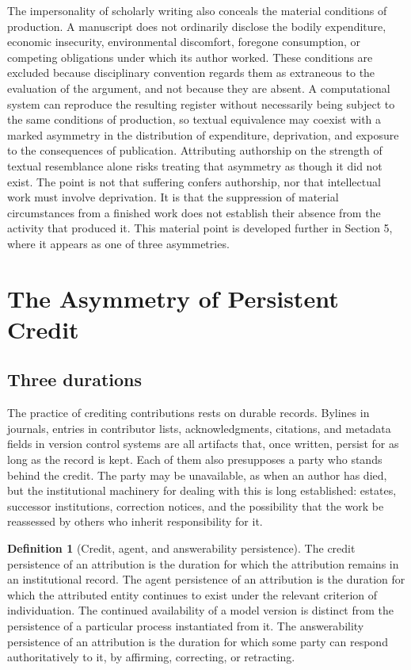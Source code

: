 \documentclass[12pt]{article}
\theoremstyle{definition}
\newtheorem{definition}{Definition}
\theoremstyle{plain}
\begin{document}
The impersonality of scholarly writing also conceals the material conditions of production. A manuscript does not ordinarily disclose the bodily expenditure, economic insecurity, environmental discomfort, foregone consumption, or competing obligations under which its author worked. These conditions are excluded because disciplinary convention regards them as extraneous to the evaluation of the argument, and not because they are absent. A computational system can reproduce the resulting register without necessarily being subject to the same conditions of production, so textual equivalence may coexist with a marked asymmetry in the distribution of expenditure, deprivation, and exposure to the consequences of publication. Attributing authorship on the strength of textual resemblance alone risks treating that asymmetry as though it did not exist. The point is not that suffering confers authorship, nor that intellectual work must involve deprivation. It is that the suppression of material circumstances from a finished work does not establish their absence from the activity that produced it. This material point is developed further in Section 5, where it appears as one of three asymmetries.

\section{The Asymmetry of Persistent Credit}

\subsection{Three durations}

The practice of crediting contributions rests on durable records. Bylines in journals, entries in contributor lists, acknowledgments, citations, and metadata fields in version control systems are all artifacts that, once written, persist for as long as the record is kept. Each of them also presupposes a party who stands behind the credit. The party may be unavailable, as when an author has died, but the institutional machinery for dealing with this is long established: estates, successor institutions, correction notices, and the possibility that the work be reassessed by others who inherit responsibility for it.

\begin{definition}[Credit, agent, and answerability persistence]
The credit persistence of an attribution is the duration for which the attribution remains in an institutional record. The agent persistence of an attribution is the duration for which the attributed entity continues to exist under the relevant criterion of individuation. The continued availability of a model version is distinct from the persistence of a particular process instantiated from it. The answerability persistence of an attribution is the duration for which some party can respond authoritatively to it, by affirming, correcting, or retracting.
\end{definition}
\end{document}
